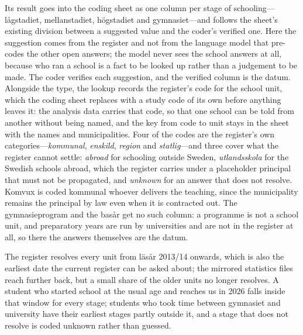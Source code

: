 Its result goes into the coding sheet as one column per stage of
schooling---lågstadiet, mellanstadiet, högstadiet and gymnasiet---and
follows the sheet's existing division between a suggested value and the
coder's verified one.
Here the suggestion comes from the register and not from the language
model that pre-codes the other open answers; the model never sees the
school answers at all, because who ran a school is a fact to be looked up
rather than a judgement to be made.
The coder verifies each suggestion, and the verified column is the datum.
Alongside the type, the lookup records the register's code for the school
unit, which the coding sheet replaces with a study code of its own before
anything leaves it: the analysis data carries that code, so that one
school can be told from another without being named, and the key from
code to unit stays in the sheet with the names and municipalities.
Four of the codes are the register's own categories---\emph{kommunal},
\emph{enskild}, \emph{region} and \emph{statlig}---and three cover what
the register cannot settle: \emph{abroad} for schooling outside Sweden,
\emph{utlandsskola} for the Swedish schools abroad, which the register
carries under a placeholder principal that must not be propagated, and
\emph{unknown} for an answer that does not resolve.
Komvux is coded kommunal whoever delivers the teaching, since the
municipality remains the principal by law even when it is contracted out.
The gymnasieprogram and the basår get no such column: a programme is not a
school unit, and preparatory years are run by universities and are not in
the register at all, so there the answers themselves are the datum.

The register resolves every unit from läsår 2013/14 onwards, which is also
the earliest date the current register can be asked about; the mirrored
statistics files reach further back, but a small share of the older units
no longer resolves.
A student who started school at the usual age and reaches us in 2026 falls
inside that window for every stage; students who took time between
gymnasiet and university have their earliest stages partly outside it, and
a stage that does not resolve is coded unknown rather than guessed.

